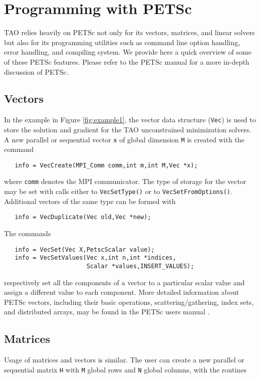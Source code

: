 \section{Programming with PETSc}
\label{sec:tao_programming}
TAO relies heavily on PETSc not only for its vectors, matrices, and linear
solvers but also for its programming utilities such as command line option 
handling, error handling, and compiling system.  We provide here a quick 
overview of some of these PETSc features.  Please refer to the PETSc 
manual \cite{petsc-user-ref} for a more in-depth
discussion of PETSc.

\subsection*{Vectors}

In the example in Figure \ref{fig:example1}, the vector data structure
(\texttt{Vec}) is used to store the solution and gradient for the TAO
unconstrained minimization solvers.  A new parallel or sequential
vector \texttt{x} of global dimension \texttt{M} is created with the
command 
\begin{verbatim}
   info = VecCreate(MPI_Comm comm,int m,int M,Vec *x);
\end{verbatim}
\noindent
where \texttt{comm} denotes the MPI communicator. The type of storage
for the vector may be set with calls either to \texttt{VecSetType()}
or to \texttt{VecSetFromOptions()}.  Additional vectors of the same type
can be formed with 
\begin{verbatim}
   info = VecDuplicate(Vec old,Vec *new);
\end{verbatim}
\noindent
The commands
\begin{verbatim}
   info = VecSet(Vec X,PetscScalar value);
   info = VecSetValues(Vec x,int n,int *indices,
                       Scalar *values,INSERT_VALUES);
\end{verbatim}
\noindent
respectively set all the components of a vector to a particular scalar
value and assign a different value to each component.  More detailed
information about PETSc vectors, including their basic operations,
scattering/gathering, index sets, and distributed arrays, may be found
in the PETSc users manual \cite{petsc-user-ref}.

\subsection*{Matrices}

Usage of matrices and vectors is similar.  
The user can create a new parallel or sequential matrix \texttt{H} with 
\texttt{M} global rows and \texttt{N} global columns, with the routines

